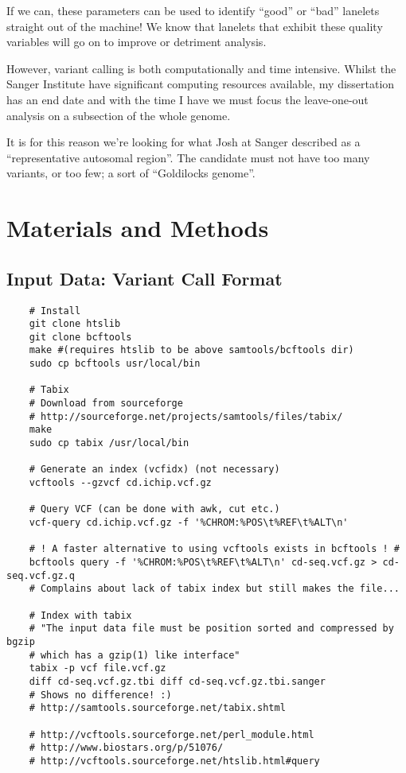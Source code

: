 If we can, these parameters can be used to identify “good” or “bad” lanelets
straight out of the machine! We know that lanelets that exhibit these quality
variables will go on to improve or detriment analysis.

However, variant calling is both computationally and time intensive.  Whilst
the Sanger Institute have significant computing resources available, my
dissertation has an end date and with the time I have we must focus the
leave-one-out analysis on a subsection of the whole genome.

It is for this reason we’re looking for what Josh at Sanger described as a
“representative autosomal region”. The candidate must not have too many
variants, or too few; a sort of “Goldilocks genome”.

\section{Materials and Methods}
\subsection{Input Data: Variant Call Format}

\begin{verbatim}
    # Install
    git clone htslib
    git clone bcftools
    make #(requires htslib to be above samtools/bcftools dir)
    sudo cp bcftools usr/local/bin

    # Tabix
    # Download from sourceforge
    # http://sourceforge.net/projects/samtools/files/tabix/
    make
    sudo cp tabix /usr/local/bin

    # Generate an index (vcfidx) (not necessary)
    vcftools --gzvcf cd.ichip.vcf.gz

    # Query VCF (can be done with awk, cut etc.)
    vcf-query cd.ichip.vcf.gz -f '%CHROM:%POS\t%REF\t%ALT\n'

    # ! A faster alternative to using vcftools exists in bcftools ! #
    bcftools query -f '%CHROM:%POS\t%REF\t%ALT\n' cd-seq.vcf.gz > cd-seq.vcf.gz.q
    # Complains about lack of tabix index but still makes the file...

    # Index with tabix
    # "The input data file must be position sorted and compressed by bgzip 
    # which has a gzip(1) like interface"
    tabix -p vcf file.vcf.gz
    diff cd-seq.vcf.gz.tbi diff cd-seq.vcf.gz.tbi.sanger
    # Shows no difference! :)
    # http://samtools.sourceforge.net/tabix.shtml

    # http://vcftools.sourceforge.net/perl_module.html
    # http://www.biostars.org/p/51076/
    # http://vcftools.sourceforge.net/htslib.html#query
\end{verbatim}


